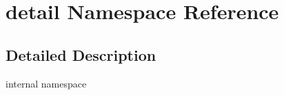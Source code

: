 \section{detail Namespace Reference}
\label{namespacedetail}




\subsection{Detailed Description}
internal namespace 

